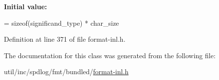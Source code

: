 {\bfseries Initial value\+:}
\begin{DoxyCode}
=
    \textcolor{keyword}{sizeof}(significand\_type) * char\_size
\end{DoxyCode}


Definition at line 371 of file format-\/inl.\+h.



The documentation for this class was generated from the following file\+:\begin{DoxyCompactItemize}
\item 
util/inc/spdlog/fmt/bundled/\hyperlink{format-inl_8h}{format-\/inl.\+h}\end{DoxyCompactItemize}
